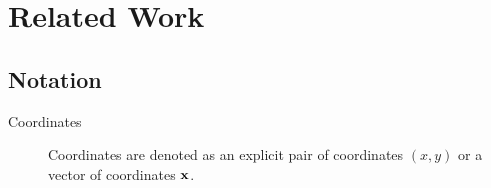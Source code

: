 
\section{Related Work}

\subsection{Notation}

\begin{description}
	\item[Coordinates]
		Coordinates are denoted as an explicit pair of coordinates $(x, y)$ or a vector of coordinates $\mathbf{x}$.

\end{description}

